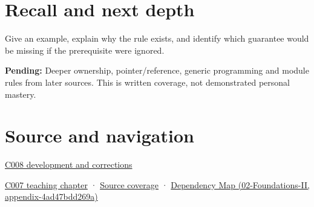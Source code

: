 \section{Recall and next depth}\label{appendix-b12b31759da1-recall-and-next-depth}

Give an example, explain why the rule exists, and identify which guarantee would be missing if the prerequisite were ignored.

\textbf{Pending:} Deeper ownership, pointer/reference, generic programming and module rules from later sources. This is written coverage, not demonstrated personal mastery.

\section{Source and navigation}\label{appendix-b12b31759da1-source-and-navigation}

\hyperref[appendix-fd090d982a15-m008---parts-113-126]{C008 development and corrections}

\href{Continuous\%20Notes/Computing\%20Foundations\%20-\%20From\%20Bits\%20to\%20C++\%20and\%20Systems\%20APIs\#A\%20spelling\%20needs\%20a\%20place\%20and\%20a\%20meaning}{C007 teaching chapter} · \hyperref[appendix-fd090d982a15-m007---parts-101-112]{Source coverage} · \href{../02-Foundations-II/main.pdf\#nameddest=appendix-4ad47bdd269a}{Dependency Map (02-Foundations-II, appendix-4ad47bdd269a)}
